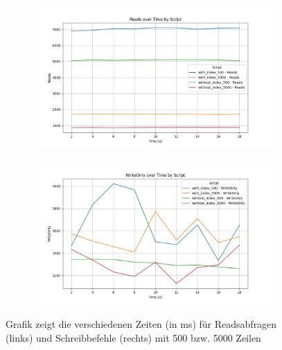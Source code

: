 \begin{figure}[!ht]
    \centering
    \begin{subfigure}[t]{0.48\textwidth}
        \centering
        \includegraphics[width=\textwidth]{PNGs/Index/B-Tree/High_Reads}
        \label{high-reads}
    \end{subfigure}
    \hfill
    \begin{subfigure}[t]{0.48\textwidth}
        \centering
        \includegraphics[width=\textwidth]{PNGs/Index/B-Tree/High_Writes}
        \label{high-writes}
    \end{subfigure}
    \caption[High-Counts: Reads und Writes]{Grafik zeigt die verschiedenen Zeiten (in ms) für Readsabfragen (links) und Schreibbefehle (rechts) mit 500 bzw. 5000 Zeilen}
    \label{fig:high-b-tree-columns}
\end{figure}

